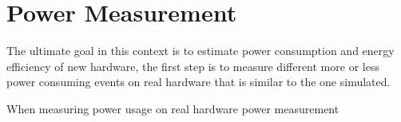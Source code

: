 \section{Power Measurement}


The ultimate goal in this context is to estimate power consumption and energy efficiency
of new hardware, the first step is to measure different more or less power consuming events on
real hardware that is similar to the one simulated.

When measuring power usage on real hardware power measurement

